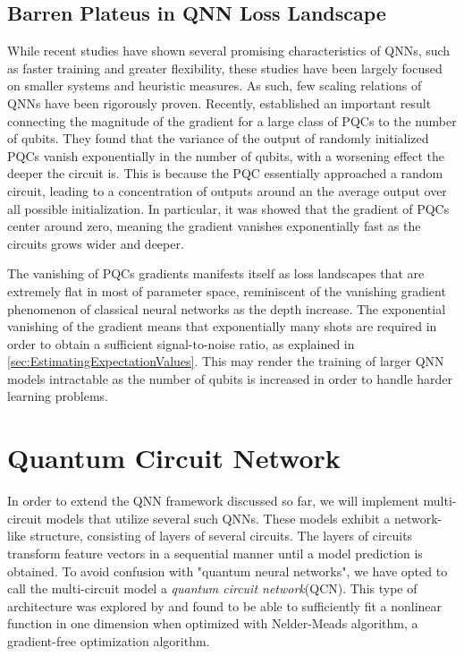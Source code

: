 \subsection{Barren Plateus in QNN Loss Landscape}\label{sec:BarrenPlateus}
While recent studies have shown several promising characteristics of QNNs, such as faster training and greater flexibility\cite{abbas2020power}, these studies have been largely focused on smaller systems and heuristic measures. As such, few scaling relations of QNNs have been rigorously proven. Recently, \citet{McClean_2018} established an important result connecting the magnitude of the gradient for a large class of PQCs to the number of qubits. They found that the variance of the output of randomly initialized PQCs vanish exponentially in the number of qubits, with a worsening effect the deeper the circuit is. This is because the PQC essentially approached a random circuit,  leading to a concentration of outputs around an the average output over all possible initialization. In particular, it was showed that the gradient of PQCs center around zero, meaning the gradient vanishes exponentially fast as the circuits grows wider and deeper.  


The vanishing of PQCs gradients manifests itself as loss landscapes that are extremely flat in most of parameter space, reminiscent of the vanishing gradient phenomenon of classical neural networks as the depth increase\cite{shalevshwartz2017failures}. The exponential vanishing of the gradient means that exponentially many shots are required in order to obtain a sufficient signal-to-noise ratio, as explained in \autoref{sec:EstimatingExpectationValues}. This may render the training of larger QNN models intractable as the number of qubits is increased in order to handle harder learning problems.


\section{Quantum Circuit Network}\label{sec:Quantum Circuit Network}
In order to extend the QNN framework discussed so far, we will implement multi-circuit models that utilize several such QNNs. These models exhibit a network-like structure, consisting of layers of several circuits. The layers of circuits transform feature vectors in a sequential manner until a model prediction is obtained. To avoid confusion with "quantum neural networks", we have opted to call the multi-circuit model a \emph{quantum circuit network}(QCN). This type of architecture was explored by \citet{b} and found to be able to sufficiently fit a nonlinear function in one dimension when optimized with Nelder-Meads algorithm, a gradient-free optimization algorithm.


